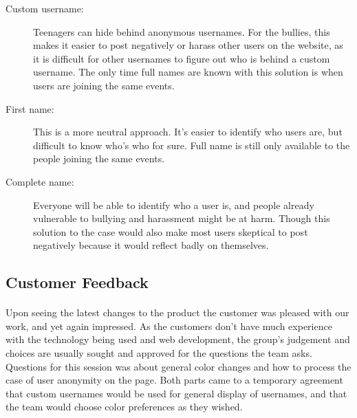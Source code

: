 \begin{description}
\item[Custom username: ] Teenagers can hide behind anonymous usernames. For the bullies, this makes it easier to post negatively or harass other users on the website, as it is difficult for other usernames to figure out who is behind a custom username. The only time full names are known with this solution is when users are joining the same events. 
\item[First name: ] This is a more neutral approach. It's easier to identify who users are, but difficult to know who's who for sure. Full name is still only available to the people joining the same events. 
\item[Complete name: ] Everyone will be able to identify who a user is, and people already vulnerable to bullying and harassment might be at harm. Though this solution to the case would also make most users skeptical to post negatively because it would reflect badly on themselves. 
\end{description}


\subsection{Customer Feedback}

\paragraph{} Upon seeing the latest changes to the product the customer was pleased with our work, and yet again impressed. As the customers don't have much experience with the technology being used and web development, the group's judgement and choices are usually sought and approved for the questions the team asks. Questions for this session was about general color changes and how to process the case of user anonymity on the page. Both parts came to a temporary agreement that custom usernames would be used for general display of usernames, and that the team would choose color preferences as they wished. 
